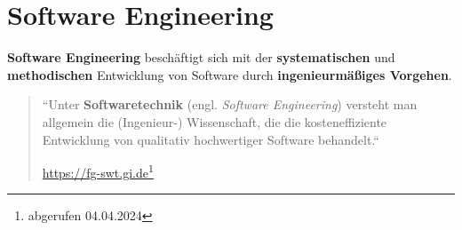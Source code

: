 \section{Software Engineering}



\begin{tcolorbox}[title={Software Engineering}]
    \textbf{Software Engineering} beschäftigt sich mit der \textbf{systematischen} und \textbf{methodischen} Entwicklung von Software durch \textbf{ingenieurmäßiges Vorgehen}.\\

    \blockquote[{\url{https://fg-swt.gi.de}\footnote{abgerufen 04.04.2024}}]{``Unter \textbf{Softwaretechnik} (engl. \textit{Software Engineering}) versteht man allgemein die (Ingenieur-) Wissenschaft, die die kosteneffiziente Entwicklung von qualitativ hochwertiger Software behandelt.``}
\end{tcolorbox}
